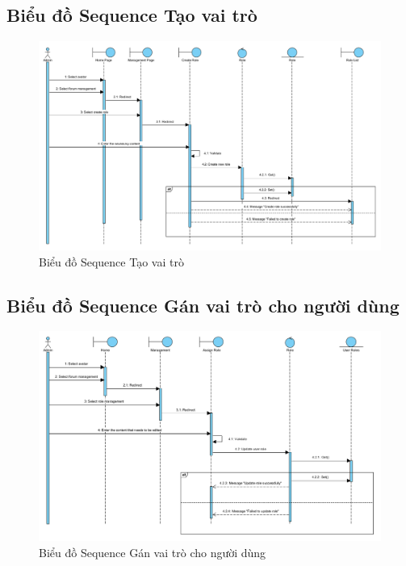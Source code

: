 \documentclass[../index.tex]{subfiles}
\begin{document}
    \subsection{Biểu đồ Sequence Tạo vai trò}
    \begin{figure}[H]
        \centering
        \includegraphics[width=0.8\linewidth]{figures/sequences/sequence-role-create.png}
        \caption{Biểu đồ Sequence Tạo vai trò}
    \end{figure}

    \subsection{Biểu đồ Sequence Gán vai trò cho người dùng}
    \begin{figure}[H]
        \centering
        \includegraphics[width=0.8\linewidth]{figures/sequences/sequence-role-assign.png}
        \caption{Biểu đồ Sequence Gán vai trò cho người dùng}
    \end{figure}
\end{document}
